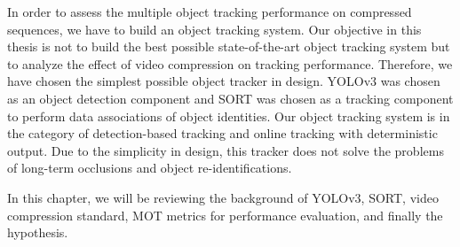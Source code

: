 
In order to assess the multiple object tracking performance on compressed sequences, we have to build an object tracking system. Our objective in this thesis is not to build the best possible state-of-the-art object tracking system but to analyze the effect of video compression on tracking performance. Therefore, we have chosen the simplest possible object tracker in design. YOLOv3 was chosen as an object detection component and SORT was chosen as a tracking component to perform data associations of object identities. Our object tracking system is in the category of detection-based tracking and online tracking with deterministic output. Due to the simplicity in design, this tracker does not solve the problems of long-term occlusions and object re-identifications.

In this chapter, we will be reviewing the background of YOLOv3, SORT, video compression standard, MOT metrics for performance evaluation, and finally the hypothesis.